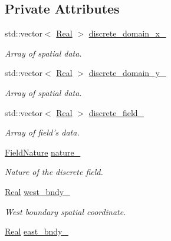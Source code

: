 \subsection*{Private Attributes}
\begin{DoxyCompactItemize}
\item 
std\+::vector$<$ \hyperlink{group__c01-roots_gac080bbbf5cbb5502c9f00405f894857d}{Real} $>$ \hyperlink{classmtk_1_1UniStgGrid2D_ab15979865852583a46662ea592f27a4f}{discrete\+\_\+domain\+\_\+x\+\_\+}
\begin{DoxyCompactList}\small\item\em Array of spatial data. \end{DoxyCompactList}\item 
std\+::vector$<$ \hyperlink{group__c01-roots_gac080bbbf5cbb5502c9f00405f894857d}{Real} $>$ \hyperlink{classmtk_1_1UniStgGrid2D_ad69f93d4b27707d97f209b907383a7a2}{discrete\+\_\+domain\+\_\+y\+\_\+}
\begin{DoxyCompactList}\small\item\em Array of spatial data. \end{DoxyCompactList}\item 
std\+::vector$<$ \hyperlink{group__c01-roots_gac080bbbf5cbb5502c9f00405f894857d}{Real} $>$ \hyperlink{classmtk_1_1UniStgGrid2D_ad7474b2669ee988b84aed20b7f5dc7be}{discrete\+\_\+field\+\_\+}
\begin{DoxyCompactList}\small\item\em Array of field's data. \end{DoxyCompactList}\item 
\hyperlink{group__c02-enums_ga4c54f2a329cfb4e56213b02a259d19e2}{Field\+Nature} \hyperlink{classmtk_1_1UniStgGrid2D_ac8b66740d328803f7fbabd1c42c775b2}{nature\+\_\+}
\begin{DoxyCompactList}\small\item\em Nature of the discrete field. \end{DoxyCompactList}\item 
\hyperlink{group__c01-roots_gac080bbbf5cbb5502c9f00405f894857d}{Real} \hyperlink{classmtk_1_1UniStgGrid2D_a59c42d8099a017bc8a082fddc1e5606c}{west\+\_\+bndy\+\_\+}
\begin{DoxyCompactList}\small\item\em West boundary spatial coordinate. \end{DoxyCompactList}\item 
\hyperlink{group__c01-roots_gac080bbbf5cbb5502c9f00405f894857d}{Real} \hyperlink{classmtk_1_1UniStgGrid2D_ae24f3d5bf5ed3a6d066cdf48aa1fb307}{east\+\_\+bndy\+\_\+}

\end{DoxyCompactItemize}
